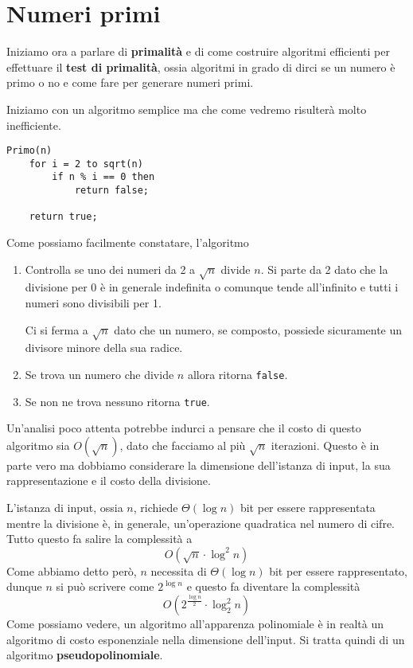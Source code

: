 \chapter{Numeri primi}\label{primi}
Iniziamo ora a parlare di \textbf{primalit\`a} e di come costruire algoritmi efficienti per effettuare il
\textbf{test di primalit\`a}, ossia algoritmi in grado di dirci se un numero \`e primo o no e come fare per generare
numeri primi.

Iniziamo con un algoritmo semplice ma che come vedremo risulter\`a molto inefficiente.
\begin{lstlisting}[style=pseudo-style]
Primo(n)
	for i = 2 to sqrt(n)
		if n % i == 0 then
			return false;
	
	return true;
\end{lstlisting}
Come possiamo facilmente constatare, l'algoritmo
\begin{enumerate}
	\item Controlla se uno dei numeri da 2 a $\sqrt{n}$ divide $n$. Si parte da 2 dato che la divisione per 0 \`e in
	      generale indefinita o comunque tende all'infinito e tutti i numeri sono divisibili per 1.

	      Ci si ferma a $\sqrt{n}$ dato che un numero, se composto, possiede sicuramente un divisore minore della sua
	      radice.
	\item Se trova un numero che divide $n$ allora ritorna \verb|false|.
	\item Se non ne trova nessuno ritorna \verb|true|.
\end{enumerate}
Un'analisi poco attenta potrebbe indurci a pensare che il costo di questo algoritmo sia $O(\sqrt{n})$, dato che
facciamo al pi\`u $\sqrt{n}$ iterazioni. Questo \`e in parte vero ma dobbiamo considerare la dimensione dell'istanza
di input, la sua rappresentazione e il costo della divisione.

L'istanza di input, ossia $n$, richiede $\Theta(\log n)$ bit per essere rappresentata mentre la divisione \`e, in
generale, un'operazione quadratica nel numero di cifre. Tutto questo fa salire la complessit\`a a
\[ O(\sqrt{n} \cdot \log^2 n) \]
Come abbiamo detto per\`o, $n$ necessita di $\Theta(\log n)$ bit per essere rappresentato, dunque $n$
si pu\`o scrivere come $2^{\log n}$ e questo fa diventare la complessit\`a
\[ O(2^\frac{\log n}{2} \cdot \log^2_2 n) \]
Come possiamo vedere, un algoritmo all'apparenza polinomiale \`e in realt\`a un algoritmo di costo esponenziale nella
dimensione dell'input. Si tratta quindi di un algoritmo \textbf{pseudopolinomiale}.


